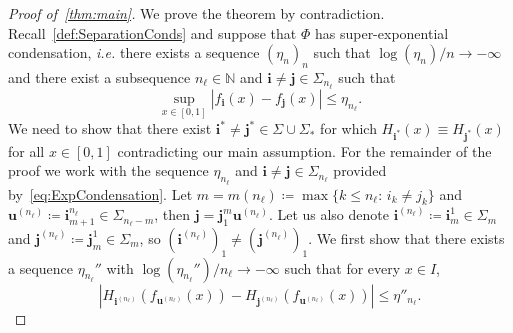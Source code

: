 \documentclass[12pt,]{article}
\def\cref#1{\ref{#1}}%
\theoremstyle{definition}
\theoremstyle{remark}
\renewcommand{\Bbb}[1]{\mathbb{#1}}
\newcommand{\bbN}{{\Bbb N}}         %
\newcommand{\0}{\mathbf{0}}
\newcommand{\bi}{\mathbf{i}}
\newcommand{\bj}{\mathbf{j}}
\newcommand{\bu}{\mathbf{u}}
\begin{document}
{\begin{proof}[Proof of~\cref{thm:main}]
We prove the theorem by contradiction. Recall~\cref{def:SeparationConds} and suppose that $\Phi$ has
super-exponential condensation, \emph{i.e.} there exists a sequence $(\eta_n)_n$ such that
$\log(\eta_n)/n\to-\infty$ and there exist a subsequence $n_{\ell}\in\bbN$ and
$\bi\neq\bj\in\Sigma_{n_\ell}$ such that
\begin{equation}\label{eq:ExpCondensation}
  \sup_{x\in[0,1]}|f_{\bi}(x)-f_{\bj}(x)| \leq \eta_{n_\ell}.
\end{equation}
We need to show that there exist $\bi^*\neq\bj^*\in\Sigma\cup\Sigma_*$ for which $H_{\bi^*}(x)\equiv
H_{\bj^*}(x)$ for all $x\in[0,1]$ contradicting our main assumption. For the remainder of the proof
we work with the sequence $\eta_{n_{\ell}}$ and $\bi\neq\bj\in\Sigma_{n_\ell}$ provided
by~\cref{eq:ExpCondensation}. Let $m=m(n_{\ell})\coloneqq\max\{k\leq n_{\ell}:\, i_k\neq j_k\}$ and
$\bu^{(n_{\ell})}\coloneqq \bi_{m+1}^{n_{\ell}}\in\Sigma_{n_\ell-m}$, then
$\bj=\bj_1^m\bu^{(n_{\ell})}$. Let us also denote $\bi^{(n_{\ell})}\coloneqq\bi_m^1\in\Sigma_m$ and
$\bj^{(n_{\ell})}\coloneqq\bj_m^1\in\Sigma_m$, so $(\bi^{(n_{\ell})})_1\neq (\bj^{(n_{\ell})})_1$.
We first show that there exists a sequence $\eta_{n_{\ell}}''$ with
$\log(\eta_{n_{\ell}}'')/n_{\ell}\to-\infty$ such that for every $x\in I$,
\begin{equation}\label{eq:DiffH_iSUperExp}
|H_{\bi^{(n_\ell)}}(f_{\bu^{(n_\ell)}}(x)) - H_{\bj^{(n_\ell)}}(f_{\bu^{(n_\ell)}}(x))| \leq \eta''_{n_\ell}.
\end{equation}


\end{proof}}
\end{document}
